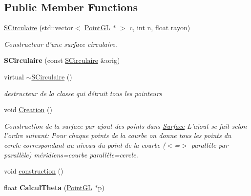 \subsection*{Public Member Functions}
\begin{DoxyCompactItemize}
\item 
\hyperlink{classSCirculaire_abc30b845fc9a038cf3f2d7c3748e2013}{S\-Circulaire} (std\-::vector$<$ \hyperlink{classPointGL}{Point\-G\-L} $\ast$ $>$ c, int n, float rayon)
\begin{DoxyCompactList}\small\item\em Constructeur d'une surface circulaire. \end{DoxyCompactList}\item 
\hypertarget{classSCirculaire_a9cf5f1017dce1bfc41f01562ea57e835}{{\bfseries S\-Circulaire} (const \hyperlink{classSCirculaire}{S\-Circulaire} \&orig)}\label{classSCirculaire_a9cf5f1017dce1bfc41f01562ea57e835}

\item 
\hypertarget{classSCirculaire_aa8cdc58cf4f3c565e9de501552a7b56c}{virtual \hyperlink{classSCirculaire_aa8cdc58cf4f3c565e9de501552a7b56c}{$\sim$\-S\-Circulaire} ()}\label{classSCirculaire_aa8cdc58cf4f3c565e9de501552a7b56c}

\begin{DoxyCompactList}\small\item\em destructeur de la classe qui détruit tous les pointeurs \end{DoxyCompactList}\item 
\hypertarget{classSCirculaire_ab9f9027637a9d0e85061a4d80623fac2}{void \hyperlink{classSCirculaire_ab9f9027637a9d0e85061a4d80623fac2}{Creation} ()}\label{classSCirculaire_ab9f9027637a9d0e85061a4d80623fac2}

\begin{DoxyCompactList}\small\item\em Construction de la surface par ajout des points dans \hyperlink{classSurface}{Surface} L'ajout se fait selon l'ordre suivant\-: Pour chaque points de la courbe on donne tous les points du cercle correspondant au niveau du point de la courbe ($<$=$>$ parallèle par parallèle) méridiens=courbe parallèle=cercle. \end{DoxyCompactList}\item 
void \hyperlink{classSCirculaire_a7db7e11fa18f5e00b870d7c062427572}{construction} ()
\item 
\hypertarget{classSCirculaire_ae1efd417c1a56b007746371e1534a94c}{float {\bfseries Calcul\-Theta} (\hyperlink{classPointGL}{Point\-G\-L} $\ast$p)}\label{classSCirculaire_ae1efd417c1a56b007746371e1534a94c}


\end{DoxyCompactItemize}
